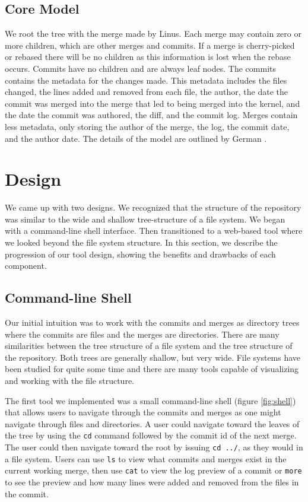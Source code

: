 \documentclass[conference, draftclsnofoot]{IEEEtran}
\begin{document}
\subsection{Core Model}

We root the tree with the merge made by Linus. Each merge may contain zero or more
children, which are other merges and commits. If a merge is cherry-picked or rebased
there will be no children as this information is lost when the rebase occurs.
Commits have no children and are always leaf nodes. The commits contains the
metadata for the changes made. This metadata includes the files changed, the lines
added and removed from each file, the author, the date the commit was merged into
the merge that led to being merged into the kernel, and the date the commit was
authored, the diff, and the commit log. Merges contain less metadata, only storing
the author of the merge, the log, the commit date, and the author date. The details
of the model are outlined by German \cite{German2015}.

\section{Design}


We came up with two designs. We recognized that the structure of the repository was
similar to the wide and shallow tree-structure of a file system. We began with a
command-line shell interface. Then transitioned to a web-based tool where we looked
beyond the file system structure. In this section, we describe the progression of
our tool design, showing the benefits and drawbacks of each component.

\subsection{Command-line Shell}

Our initial intuition was to work with the commits and merges as directory trees
where the commits are files and the merges are directories. There are many
similarities between the tree structure of a file system and the tree structure of
the repository. Both trees are generally shallow, but very wide. File systems have
been studied for quite some time and there are many tools capable of visualizing and
working with the file structure.

The first tool we implemented was a small command-line shell (figure
\ref{fig:shell}) that allows users to navigate through the commits and merges as one
might navigate through files and directories. A user could navigate toward the
leaves of the tree by using the \verb|cd| command followed by the commit id of the
next merge. The user could then navigate toward the root by issuing \verb|cd ../|,
as they would in a file system. Users can use \verb|ls| to view what commits and
merges exist in the current working merge, then use \verb|cat| to view the log
preview of a commit or \verb|more| to see the preview and how many lines were added
and removed from the files in the commit.
\end{document}
